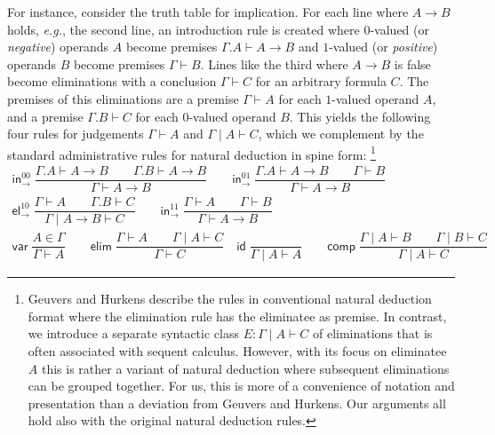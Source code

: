 \documentclass[a4paper]{easychair}
\newcommand{\eg}{\emph{e.g.}\xspace}
\newcommand{\tid}{\mathsf{id}}
\newcommand{\tcomp}{\mathsf{comp}}
\newcommand{\telim}{\mathsf{elim}}
\newcommand{\tvar}{\mathsf{var}}
\newcommand{\nru}[3]{#1\;\dfrac{#2}{#3}}
\newcommand{\tin}{\ensuremath{\mathsf{in}}}
\newcommand{\inn}[2]{\ensuremath{\tin_{#1}^{#2}}}
\newcommand{\tel}{\mathsf{el}}
\newcommand{\el}[2]{\ensuremath{\tel_{#1}^{#2}}}
\begin{document}
\wraptt
For instance, consider the truth table for implication.
For each line where $A \to B$ holds, \eg, the second line, an
introduction rule is created where $0$-valued (or \emph{negative})
operands $A$ become premises $\Gamma.A \vdash A \to B$ and $1$-valued
(or \emph{positive}) operands $B$ become premises $\Gamma \vdash B$.
Lines like the third where $A \to B$ is false become eliminations
with a conclusion $\Gamma \vdash C$ for an arbitrary formula $C$.
The premises of this eliminations are
a premise $\Gamma \vdash A$ for each $1$-valued operand $A$, and
a premise $\Gamma.B \vdash C$ for each $0$-valued operand $B$.
This yields the following four rules for judgements
$\Gamma \vdash A$ and $\Gamma \mid A \vdash C$, which we complement by
the standard administrative rules for natural deduction in spine
form:%
%
\footnote{Geuvers and Hurkens describe the rules in conventional
  natural deduction format where the elimination rule has the
  eliminatee as premise.  In contrast, we introduce a separate
  syntactic class $E : \Gamma \mid A \vdash C$ of eliminations that is
  often associated with sequent calculus.  However, with its focus on
  eliminatee $A$ this is rather a variant of natural deduction where
  subsequent eliminations can be grouped together.  For us, this
  is more of a convenience of notation and presentation than a deviation
  from Geuvers and Hurkens.  Our arguments all hold also with the
  original natural deduction rules.}
%
\begin{gather*}
  \nru{\inn\to{00}
     }{\Gamma.A \vdash A \to B \qquad
       \Gamma.B \vdash A \to B
     }{\Gamma \vdash A \to B
     }
\qquad
  \nru{\inn\to{01}
     }{\Gamma.A \vdash A \to B \qquad
       \Gamma \vdash B
    }{\Gamma \vdash A \to B
    }
\\[2ex]
  \nru{\el\to{10}
     }{\Gamma \vdash A \qquad
       \Gamma.B \vdash C
     }{\Gamma \mid A \to B \vdash C
     }
\qquad
  \nru{\inn\to{11}
     }{\Gamma \vdash A \qquad
       \Gamma \vdash B
     }{\Gamma \vdash A \to B
     }
\\[2ex]
  \nru{\tvar
     }{A \in \Gamma
     }{\Gamma \vdash A}
\qquad
  \nru{\telim
     }{\Gamma \vdash A \qquad
       \Gamma \mid A \vdash C
     }{\Gamma \vdash C}
\quad
  \nru{\tid
     }{
     }{\Gamma \mid A \vdash A}
\qquad
  \nru{\tcomp
     }{\Gamma \mid A \vdash B \qquad
       \Gamma \mid B \vdash C
     }{\Gamma \mid A \vdash C}
\end{gather*}
\end{document}

